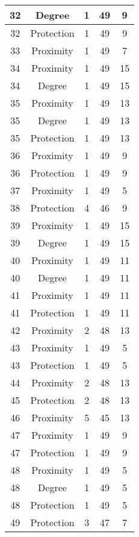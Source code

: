 \documentclass[results.tex]{subfiles}
\begin{document}
\begin{center}
\begin{tabular}{| c || c | c | c | c |}
    \hline
    32 & Degree & 1 & 49 & 9 \\ 
    \hline
    32 & Protection & 1 & 49 & 9 \\ 
    \hline
    33 & Proximity & 1 & 49 & 7 \\ 
    \hline
    34 & Proximity & 1 & 49 & 15 \\ 
    \hline
    34 & Degree & 1 & 49 & 15 \\ 
    \hline
    35 & Proximity & 1 & 49 & 13 \\ 
    \hline
    35 & Degree & 1 & 49 & 13 \\ 
    \hline
    35 & Protection & 1 & 49 & 13 \\ 
    \hline
    36 & Proximity & 1 & 49 & 9 \\ 
    \hline
    36 & Protection & 1 & 49 & 9 \\ 
    \hline
    37 & Proximity & 1 & 49 & 5 \\ 
    \hline
    38 & Protection & 4 & 46 & 9 \\ 
    \hline
    39 & Proximity & 1 & 49 & 15 \\ 
    \hline
    39 & Degree & 1 & 49 & 15 \\ 
    \hline
    40 & Proximity & 1 & 49 & 11 \\ 
    \hline
    40 & Degree & 1 & 49 & 11 \\ 
    \hline
    41 & Proximity & 1 & 49 & 11 \\ 
    \hline
    41 & Protection & 1 & 49 & 11 \\ 
    \hline
    42 & Proximity & 2 & 48 & 13 \\ 
    \hline
    43 & Proximity & 1 & 49 & 5 \\ 
    \hline
    43 & Protection & 1 & 49 & 5 \\ 
    \hline
    44 & Proximity & 2 & 48 & 13 \\ 
    \hline
    45 & Protection & 2 & 48 & 13 \\ 
    \hline
    46 & Proximity & 5 & 45 & 13 \\ 
    \hline
    47 & Proximity & 1 & 49 & 9 \\ 
    \hline
    47 & Protection & 1 & 49 & 9 \\ 
    \hline
    48 & Proximity & 1 & 49 & 5 \\ 
    \hline
    48 & Degree & 1 & 49 & 5 \\ 
    \hline
    48 & Protection & 1 & 49 & 5 \\ 
    \hline
    49 & Protection & 3 & 47 & 7 \\ 
    \hline   \end{tabular}
\end{center}
\end{document}
